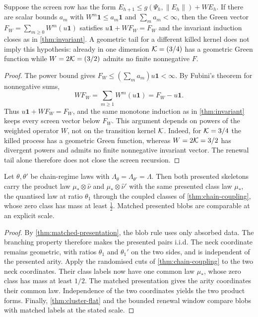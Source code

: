 \begin{proposition}
\label{thm:renewal-weight-gap}
\leanok
Suppose the screen row has the form $E_{h+1}\leq g(\Psi_h,\lVert E_h\rVert)+WE_h$. If there are
scalar bounds $a_m$ with $W^m\mathbf1\leq a_m\mathbf1$ and $\sum_ma_m<\infty$, then the Green
vector $F_W=\sum_{m\geq0}W^m(u\mathbf1)$ satisfies $u\mathbf1+WF_W=F_W$ and the invariant
induction closes as in \cref{thm:invariant}. A geometric tail for a different killed kernel does
not imply this hypothesis: already in one dimension $\mathcal{K}=(3/4)$ has a geometric Green function
while $W=2\mathcal{K}=(3/2)$ admits no finite nonnegative $F$.
\end{proposition}

\begin{proof}
\leanok
{}
The power bound gives
$F_W\leq(\sum_m a_m)u\mathbf1<\infty$. By Fubini's theorem for nonnegative sums,
\[
 WF_W=\sum_{m\geq1}W^m(u\mathbf1)=F_W-u\mathbf1.
\]
Thus $u\mathbf1+WF_W=F_W$, and the same monotone induction as in \cref{thm:invariant} keeps every
screen vector below $F_W$. This argument depends on powers of the weighted operator $W$, not on
the transition kernel $\mathcal{K}$. Indeed, for $\mathcal{K}=3/4$ the killed process has a geometric Green
function, whereas $W=2\mathcal{K}=3/2$ has divergent powers and admits no finite nonnegative invariant
vector. The renewal tail alone therefore does not close the screen recursion.
\end{proof}

\begin{proposition}
\label{thm:chain-cross}
\leanok
Let $\theta,\theta'$ be chain-regime laws with $\Lambda_{\theta}=\Lambda_{\theta'}=\Lambda$.
Then both presented skeletons carry the product law $\mu_*\otimes\hat\nu$ and
$\mu_*\otimes\hat\nu'$ with the same presented class law $\mu_*$, the quantised law at ratio
$\theta_1$ through the coupled classes of \cref{thm:chain-coupling}, whose zero class has mass
at least $\tfrac12$. Matched presented blobs are comparable at an explicit scale.
\end{proposition}

\begin{proof}
\leanok
{}
By \cref{thm:matched-presentation}, the blob rule uses only absorbed data. The branching property
therefore makes the presented pairs i.i.d. The neck coordinate remains geometric, with ratios
$\theta_1$ and $\theta_1'$ on the two sides, and is independent of the presented arity. Apply the
randomised cuts of \cref{thm:chain-coupling} to the two neck coordinates. Their class labels now
have one common law $\mu_*$, whose zero class has mass at least $1/2$. The matched presentation
gives the arity coordinates their common law. Independence of the two coordinates yields the two
product forms. Finally, \cref{thm:cluster-flat} and the bounded renewal window compare blobs with
matched labels at the stated scale.
\end{proof}

